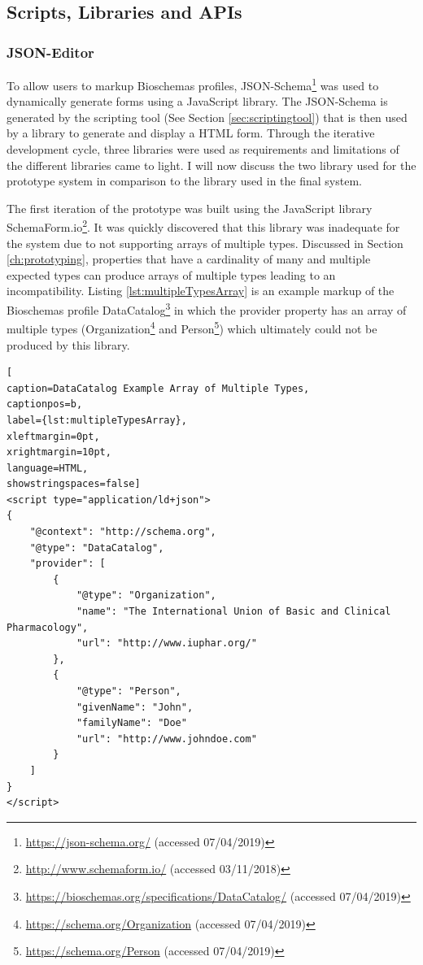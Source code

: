 \newpage
\subsection{Scripts, Libraries and APIs}\label{sec:libraries}

\subsubsection{JSON-Editor} \label{sec:jsoneditor}
To allow users to markup Bioschemas profiles, JSON-Schema\footnote{\url{https://json-schema.org/} (accessed 07/04/2019)} was used to dynamically generate forms using a JavaScript library. The JSON-Schema is generated by the scripting tool (See Section \ref{sec:scriptingtool}) that is then used by a library to generate and display a HTML form. Through the iterative development cycle, three libraries were used as requirements and limitations of the different libraries came to light. I will now discuss the two library used for the prototype system in comparison to the library used in the final system.

The first iteration of the prototype was built using the JavaScript library SchemaForm.io\footnote{\url{http://www.schemaform.io/} (accessed 03/11/2018)}. It was quickly discovered that this library was inadequate for the system due to not supporting arrays of multiple types. Discussed in Section \ref{ch:prototyping}, properties that have a cardinality of many and multiple expected types can produce arrays of multiple types leading to an incompatibility. Listing \ref{lst:multipleTypesArray} is an example markup of the Bioschemas profile DataCatalog\footnote{\url{https://bioschemas.org/specifications/DataCatalog/} (accessed 07/04/2019)} in which the provider property has an array of multiple types (Organization\footnote{\url{https://schema.org/Organization} (accessed 07/04/2019)} and Person\footnote{\url{https://schema.org/Person} (accessed 07/04/2019)}) which ultimately could not be produced by this library.

\vspace{1.5em}

{
\begin{center}
\begin{lstlisting}[
caption=DataCatalog Example Array of Multiple Types,
captionpos=b,
label={lst:multipleTypesArray},
xleftmargin=0pt,
xrightmargin=10pt,
language=HTML,
showstringspaces=false]
<script type="application/ld+json">
{
    "@context": "http://schema.org",
    "@type": "DataCatalog",
    "provider": [
        {
            "@type": "Organization",
            "name": "The International Union of Basic and Clinical Pharmacology",
            "url": "http://www.iuphar.org/"
        },
        {
            "@type": "Person",
            "givenName": "John",
            "familyName": "Doe"
            "url": "http://www.johndoe.com"
        }
    ]
}
</script>
\end{lstlisting}  
\end{center}
}


